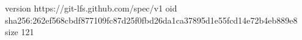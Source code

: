 version https://git-lfs.github.com/spec/v1
oid sha256:262ef568cbdf877109fc87d25f0fbd26da1ca37895d1e55fcd14e72b4eb889e8
size 121
